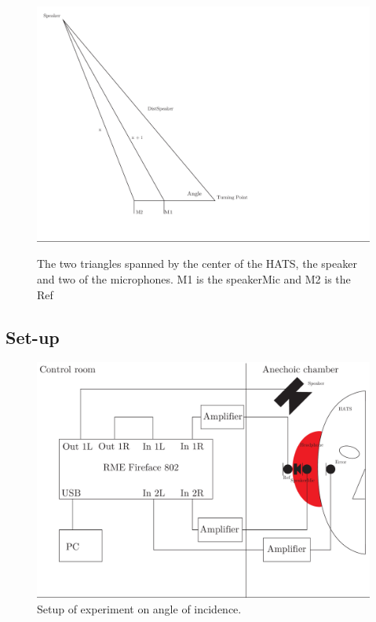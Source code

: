 \begin{figure}[H]
	\includegraphics[width=\textwidth]{../Journal/Experiments/AngleOfIncidence/TriangleCalculation.pdf}
	\label{Fig:AngleOfIcidenceTriangleCalculation}
	\caption{The two triangles spanned by the center of the HATS, the speaker and two of the microphones. M1 is the speakerMic and M2 is the Ref}
\end{figure}  


\subsection{Set-up}
\begin{figure}[H]
	\includegraphics[width=\textwidth]{../Journal/Experiments/AngleOfIncidence/AngleOfIncidenceSetup.pdf}
	\caption{Setup of experiment on angle of incidence.}
	\label{Fig:AngleOfIncidenceSetup}
\end{figure}

